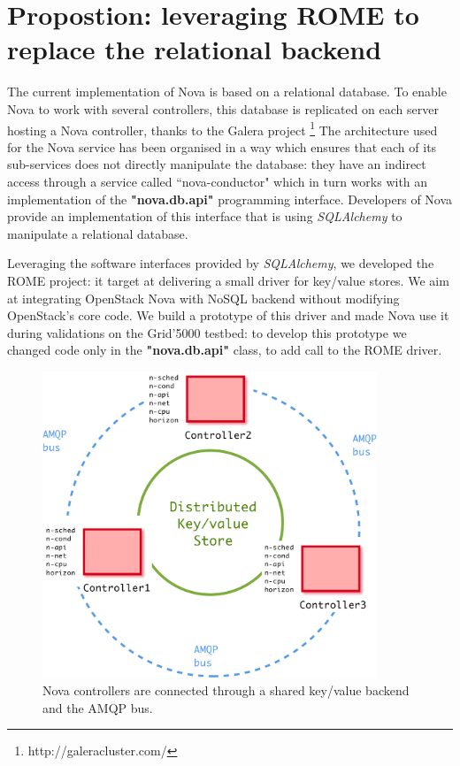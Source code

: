 \chapter{Propostion: leveraging ROME to replace the relational backend}
\label{sec:leveraging-rome}

The current implementation of Nova is based on a relational database. To enable
Nova to work with several controllers, this database is replicated on each
server hosting a Nova controller, thanks to the Galera project
\footnote{http://galeracluster.com/} The architecture used for the Nova service
has been organised in a way which ensures that each of its sub-services does not
directly manipulate the database: they have an indirect access through a service
called ``nova-conductor" which in turn works with an implementation of the
\textbf{"nova.db.api"} programming interface. Developers of Nova provide an
implementation of this interface that is using \textit{SQLAlchemy} to manipulate
a relational database.

Leveraging the software interfaces provided by \textit{SQLAlchemy}, we developed
the ROME project: it target at delivering a small driver for key/value stores.
We aim at integrating OpenStack Nova with NoSQL backend without modifying
OpenStack's core code. We build a prototype of this driver and made Nova use it
during validations on the Grid'5000 testbed: to develop this prototype we
changed code only in the \textbf{"nova.db.api"} class, to add call to the ROME
driver.

\begin{figure}[h!]
        \centering
        \includegraphics[width=10cm]{figures/OpenStack_distributed.pdf}
        \caption{Nova controllers are connected through a shared key/value backend
        and the AMQP bus.}
      \label{fig:newnova}
\vspace*{-.3cm}
\end{figure}

